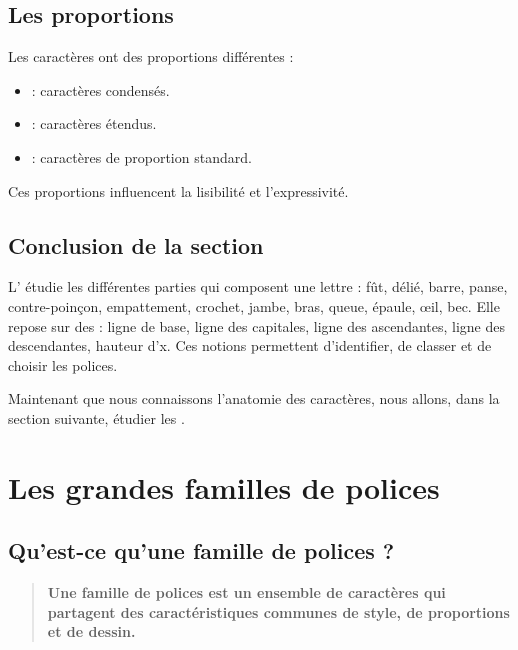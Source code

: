 \subsection{Les proportions}

Les caractères ont des proportions différentes :

\begin{itemize}
    \item {} : caractères condensés.
    \item {} : caractères étendus.
    \item {} : caractères de proportion standard.
\end{itemize}

Ces proportions influencent la lisibilité et l'expressivité.

\subsection*{Conclusion de la section}

\begin{retenir}
L' étudie les différentes parties qui composent une lettre : fût, délié, barre, panse, contre-poinçon, empattement, crochet, jambe, bras, queue, épaule, œil, bec. Elle repose sur des  : ligne de base, ligne des capitales, ligne des ascendantes, ligne des descendantes, hauteur d'x. Ces notions permettent d'identifier, de classer et de choisir les polices.
\end{retenir}

Maintenant que nous connaissons l'anatomie des caractères, nous allons, dans la section suivante, étudier les .

\section{Les grandes familles de polices}

\subsection{Qu'est-ce qu'une famille de polices ?}

\begin{quote}
\textbf{Une famille de polices est un ensemble de caractères qui partagent des caractéristiques communes de style, de proportions et de dessin.}
\end{quote}

